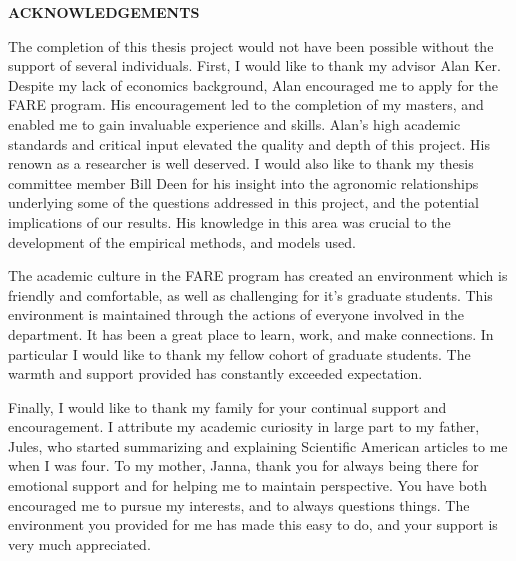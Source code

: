 \thispagestyle{plain}
\addtocounter{page}{1}
\begin{center}
\Large
\textbf{\uppercase{Acknowledgements}}
\end{center}

The completion of this thesis project would not have been possible without the support of several individuals. First, I would like to thank my advisor Alan Ker. Despite my lack of economics background, Alan encouraged me to apply for the FARE program. His encouragement led to the completion of my masters, and enabled me to gain invaluable experience and skills. Alan's high academic standards and critical input elevated the quality and depth of this project. His renown as a researcher is well deserved. I would also like to thank my thesis committee member Bill Deen for his insight into the agronomic relationships underlying some of the questions addressed in this project, and the potential implications of our results. His knowledge in this area was crucial to the development of the empirical methods, and models used.

The academic culture in the FARE program has created an environment which is friendly and comfortable, as well as challenging for it's graduate students. This environment is maintained through the actions of everyone involved in the department. It has been a great place to learn, work, and make connections. In particular I would like to thank my fellow cohort of graduate students. The warmth and support provided has constantly exceeded expectation.

Finally, I would like to thank my family for your continual support and encouragement.  I attribute my academic curiosity in large part to my father, Jules, who started summarizing and explaining Scientific American articles to me when I was four.  To my mother, Janna, thank you for always being there for emotional support and for helping me to maintain perspective. You have both encouraged me to pursue my interests, and to always questions things. The environment you provided for me has made this easy to do, and your support is very much appreciated.
